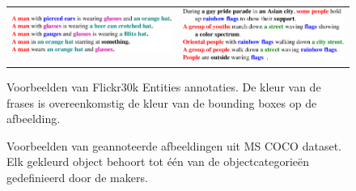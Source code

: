 \begin{figure}[!tb]
\begin{tabular}[t]{cc}
      \includegraphics[valign = T,width=.4\columnwidth]{Images/example_hat_text.pdf}&
      \includegraphics[valign = T,width=.4\columnwidth]{Images/example_parade_text.pdf}
  \end{tabular}
\caption{Voorbeelden van Flickr30k Entities annotaties. De kleur van de frases is overeenkomstig de kleur van de bounding boxes op de afbeelding.}
\label{fig:entities}
\end{figure}

\begin{figure}
    \centering
    \hfill
    \caption{Voorbeelden van geannoteerde afbeeldingen uit MS COCO dataset. Elk gekleurd object behoort tot \'e\'en van de objectcategorie\"en gedefinieerd door de makers.}
    \label{fig:cocoexamples}
\end{figure}



